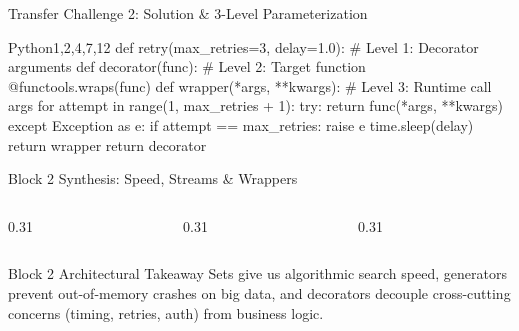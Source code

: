 \begin{frame}[fragile]{Transfer Challenge 2: Solution \& 3-Level Parameterization}
  \begin{HighlightedCodeBlock}{Python}{1,2,4,7,12}
def retry(max_retries=3, delay=1.0):      # Level 1: Decorator arguments
    def decorator(func):                  # Level 2: Target function
        @functools.wraps(func)
        def wrapper(*args, **kwargs):     # Level 3: Runtime call args
            for attempt in range(1, max_retries + 1):
                try:
                    return func(*args, **kwargs)
                except Exception as e:
                    if attempt == max_retries:
                        raise e
                    time.sleep(delay)
        return wrapper
    return decorator
  \end{HighlightedCodeBlock}
  \vfill
\end{frame}

\begin{frame}{Block 2 Synthesis: Speed, Streams \& Wrappers}
  \begin{columns}[T,onlytextwidth]
    \begin{column}{0.31\textwidth}
    \end{column}
    \begin{column}{0.31\textwidth}
    \end{column}
    \begin{column}{0.31\textwidth}
    \end{column}
  \end{columns}
  \vspace{0.20cm}
  \begin{ConceptBox}{Block 2 Architectural Takeaway}
    \scriptsize Sets give us algorithmic search speed, generators prevent out-of-memory crashes on big data, and decorators decouple cross-cutting concerns (timing, retries, auth) from business logic.
  \end{ConceptBox}
\end{frame}

